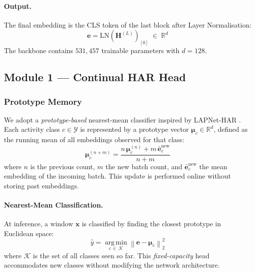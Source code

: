 \paragraph{Output.}
The final embedding is the CLS token of the last block after Layer
Normalisation:
\begin{equation}
    \mathbf{e} = \mathrm{LN}\!\left(\mathbf{H}^{(L)}\right)_{[0]}
               \;\in\; \mathbb{R}^{d}
    \label{eq:embedding}
\end{equation}
The backbone contains $531{,}457$ trainable parameters with $d = 128$.


\subsection{Module 1 --- Continual HAR Head}

\subsubsection{Prototype Memory}

We adopt a \emph{prototype-based} nearest-mean classifier inspired by
LAPNet-HAR \cite{adaimi2022lifelong}. Each activity class $c \in \mathcal{Y}$
is represented by a prototype vector $\boldsymbol{\mu}_c \in \mathbb{R}^{d}$,
defined as the running mean of all embeddings observed for that class:
\begin{equation}
    \boldsymbol{\mu}_c^{(n+m)} =
    \frac{n\,\boldsymbol{\mu}_c^{(n)} + m\,\bar{\mathbf{e}}_c^{\mathrm{new}}}
         {n + m}
    \label{eq:proto_update}
\end{equation}
where $n$ is the previous count, $m$ the new batch count, and
$\bar{\mathbf{e}}_c^{\mathrm{new}}$ the mean embedding of the incoming batch.
This update is performed online without storing past embeddings.

\paragraph{Nearest-Mean Classification.}
At inference, a window $\mathbf{x}$ is classified by finding the closest
prototype in Euclidean space:
\begin{equation}
    \hat{y} = \operatorname*{arg\,min}_{c \,\in\, \mathcal{K}}
    \left\|\mathbf{e} - \boldsymbol{\mu}_c\right\|_{2}^{2}
    \label{eq:nmc}
\end{equation}
where $\mathcal{K}$ is the set of all classes seen so far. This
\emph{fixed-capacity} head accommodates new classes without modifying the
network architecture.

